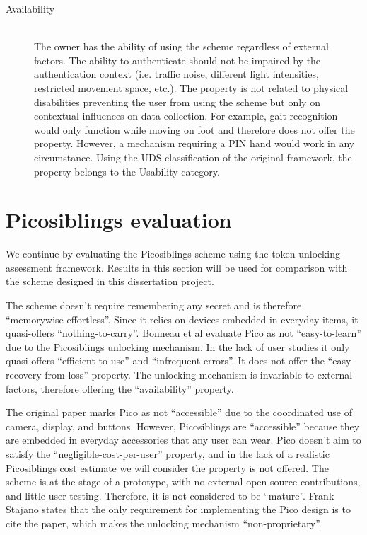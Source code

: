 \begin{description}
  \item[Availability] \hfill \\
  The owner has the ability of using the scheme regardless of external factors. The ability to authenticate should not be impaired by the authentication context (i.e. traffic noise, different light intensities, restricted movement space, etc.). The property is not related to physical disabilities preventing the user from using the scheme but only on contextual influences on data collection. For example, gait recognition would only function while moving on foot and therefore does not offer the property. However, a mechanism requiring a PIN hand would work in any circumstance. Using the UDS classification of the original framework, the property belongs to the Usability category.
  
\end{description}

%	
%
\section{Picosiblings evaluation}
\label{picosiblingseval}
We continue by evaluating the Picosiblings scheme using the token unlocking assessment framework. Results in this section will be used for comparison with the scheme designed in this dissertation project.

The scheme doesn't require remembering any secret and is therefore ``memorywise-effortless''. Since it relies on devices embedded in everyday items, it quasi-offers ``nothing-to-carry''. Bonneau et al \cite{bonneau2012quest} evaluate Pico as not ``easy-to-learn'' due to the Picosiblings unlocking mechanism. In the lack of user studies it only quasi-offers ``efficient-to-use'' and ``infrequent-errors''. It does not offer the ``easy-recovery-from-loss'' property. The unlocking mechanism is invariable to external factors, therefore offering the ``availability'' property.

The original paper marks Pico as not ``accessible'' due to the coordinated use of camera, display, and buttons. However, Picosiblings are ``accessible'' because they are embedded in everyday accessories that any user can wear. Pico doesn't aim to satisfy the ``negligible-cost-per-user'' property, and in the lack of a realistic Picosiblings cost estimate we will consider the property is not offered. The scheme is at the stage of a prototype, with no external open source contributions, and little user testing. Therefore, it is not considered to be ``mature''. Frank Stajano \cite{stajano2011pico} states that the only requirement for implementing the Pico design is to cite the paper, which makes the unlocking mechanism ``non-proprietary''.
	
